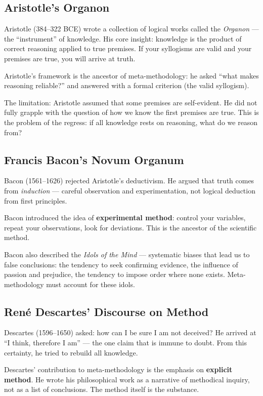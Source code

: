 \documentclass[11pt,letterpaper]{article}
\begin{document}
\subsection*{Aristotle's Organon}

Aristotle (384--322 BCE) wrote a collection of logical works called the \textit{Organon} — the ``instrument'' of knowledge. His core insight: knowledge is the product of correct reasoning applied to true premises. If your syllogisms are valid and your premises are true, you will arrive at truth.

Aristotle's framework is the ancestor of meta-methodology: he asked ``what makes reasoning reliable?'' and answered with a formal criterion (the valid syllogism).

The limitation: Aristotle assumed that some premises are self-evident. He did not fully grapple with the question of how we know the first premises are true. This is the problem of the regress: if all knowledge rests on reasoning, what do we reason from?

\subsection*{Francis Bacon's Novum Organum}

Bacon (1561--1626) rejected Aristotle's deductivism. He argued that truth comes from \textit{induction} — careful observation and experimentation, not logical deduction from first principles.

Bacon introduced the idea of \textbf{experimental method}: control your variables, repeat your observations, look for deviations. This is the ancestor of the scientific method.

Bacon also described the \textit{Idols of the Mind} — systematic biases that lead us to false conclusions: the tendency to seek confirming evidence, the influence of passion and prejudice, the tendency to impose order where none exists. Meta-methodology must account for these idols.

\subsection*{René Descartes' Discourse on Method}

Descartes (1596--1650) asked: how can I be sure I am not deceived? He arrived at ``I think, therefore I am'' — the one claim that is immune to doubt. From this certainty, he tried to rebuild all knowledge.

Descartes' contribution to meta-methodology is the emphasis on \textbf{explicit method}. He wrote his philosophical work as a narrative of methodical inquiry, not as a list of conclusions. The method itself is the substance.
\end{document}
